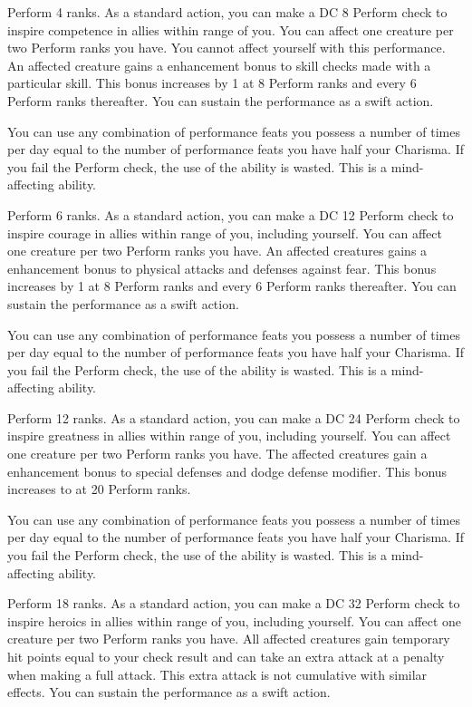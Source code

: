 \featpre Perform 4 ranks.
\featben As a standard action, you can make a DC 8 Perform check to inspire competence in allies within \rngmed range of you. You can affect one creature per two Perform ranks you have. You cannot affect yourself with this performance. An affected creature gains a  enhancement bonus to skill checks made with a particular skill. This bonus increases by 1 at 8 Perform ranks and every 6 Perform ranks thereafter. You can sustain the performance as a swift action.

You can use any combination of performance feats you possess a number of times per day equal to the number of performance feats you have \add half your Charisma. If you fail the Perform check, the use of the ability is wasted. This is a mind-affecting ability.

\featpre Perform 6 ranks.
\featben As a standard action, you can make a DC 12 Perform check to inspire courage in allies within \rngmed range of you, including yourself. You can affect one creature per two Perform ranks you have. An affected creatures gains a  enhancement bonus to physical attacks and defenses against fear. This bonus increases by 1 at 8 Perform ranks and every 6 Perform ranks thereafter. You can sustain the performance as a swift action.

You can use any combination of performance feats you possess a number of times per day equal to the number of performance feats you have \add half your Charisma. If you fail the Perform check, the use of the ability is wasted. This is a mind-affecting ability.

\featpre Perform 12 ranks.
\featben As a standard action, you can make a DC 24 Perform check to inspire greatness in allies within \rngmed range of you, including yourself. You can affect one creature per two Perform ranks you have. The affected creatures gain a  enhancement bonus to special defenses and dodge defense modifier. This bonus increases to  at 20 Perform ranks.

You can use any combination of performance feats you possess a number of times per day equal to the number of performance feats you have \add half your Charisma. If you fail the Perform check, the use of the ability is wasted. This is a mind-affecting ability.

\featpre Perform 18 ranks.
\featben As a standard action, you can make a DC 32 Perform check to inspire heroics in allies within \rngmed range of you, including yourself. You can affect one creature per two Perform ranks you have. All affected creatures gain temporary hit points equal to your check result and can take an extra attack at a  penalty when making a full attack. This extra attack is not cumulative with similar effects. You can sustain the performance as a swift action.

